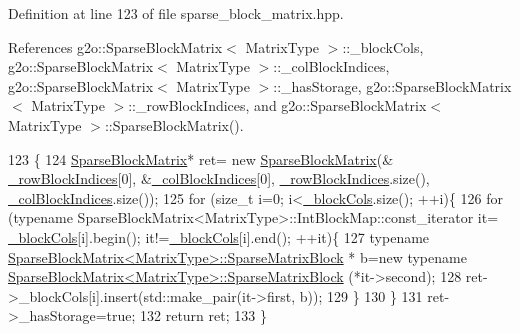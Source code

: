Definition at line 123 of file sparse\+\_\+block\+\_\+matrix.\+hpp.



References g2o\+::\+Sparse\+Block\+Matrix$<$ Matrix\+Type $>$\+::\+\_\+block\+Cols, g2o\+::\+Sparse\+Block\+Matrix$<$ Matrix\+Type $>$\+::\+\_\+col\+Block\+Indices, g2o\+::\+Sparse\+Block\+Matrix$<$ Matrix\+Type $>$\+::\+\_\+has\+Storage, g2o\+::\+Sparse\+Block\+Matrix$<$ Matrix\+Type $>$\+::\+\_\+row\+Block\+Indices, and g2o\+::\+Sparse\+Block\+Matrix$<$ Matrix\+Type $>$\+::\+Sparse\+Block\+Matrix().


\begin{DoxyCode}
123                                                                             \{
124     \hyperlink{classg2o_1_1SparseBlockMatrix_af9b8a9cb09a88bc444775a9974db8760}{SparseBlockMatrix}* ret= \textcolor{keyword}{new} \hyperlink{classg2o_1_1SparseBlockMatrix_af9b8a9cb09a88bc444775a9974db8760}{SparseBlockMatrix}(&
      \hyperlink{classg2o_1_1SparseBlockMatrix_ab0bd9c6d5b7b8704af1bc679032382e3}{\_rowBlockIndices}[0], &\hyperlink{classg2o_1_1SparseBlockMatrix_aca008740c37d2d00b90f696ab19abb59}{\_colBlockIndices}[0], 
      \hyperlink{classg2o_1_1SparseBlockMatrix_ab0bd9c6d5b7b8704af1bc679032382e3}{\_rowBlockIndices}.size(), \hyperlink{classg2o_1_1SparseBlockMatrix_aca008740c37d2d00b90f696ab19abb59}{\_colBlockIndices}.size());
125     \textcolor{keywordflow}{for} (\textcolor{keywordtype}{size\_t} i=0; i<\hyperlink{classg2o_1_1SparseBlockMatrix_ae236d56a01ba4d292450a518621b41f8}{\_blockCols}.size(); ++i)\{
126       \textcolor{keywordflow}{for} (\textcolor{keyword}{typename} SparseBlockMatrix<MatrixType>::IntBlockMap::const\_iterator it=
      \hyperlink{classg2o_1_1SparseBlockMatrix_ae236d56a01ba4d292450a518621b41f8}{\_blockCols}[i].begin(); it!=\hyperlink{classg2o_1_1SparseBlockMatrix_ae236d56a01ba4d292450a518621b41f8}{\_blockCols}[i].end(); ++it)\{
127         \textcolor{keyword}{typename} \hyperlink{classg2o_1_1SparseBlockMatrix_ab2f7376cbf055803fda6527dcc43e3be}{SparseBlockMatrix<MatrixType>::SparseMatrixBlock}
      * b=\textcolor{keyword}{new} \textcolor{keyword}{typename} \hyperlink{classg2o_1_1SparseBlockMatrix_ab2f7376cbf055803fda6527dcc43e3be}{SparseBlockMatrix<MatrixType>::SparseMatrixBlock}
      (*it->second);
128         ret->\_blockCols[i].insert(std::make\_pair(it->first, b));
129       \}
130     \}
131     ret->\_hasStorage=\textcolor{keyword}{true};
132     \textcolor{keywordflow}{return} ret;
133   \}
\end{DoxyCode}
